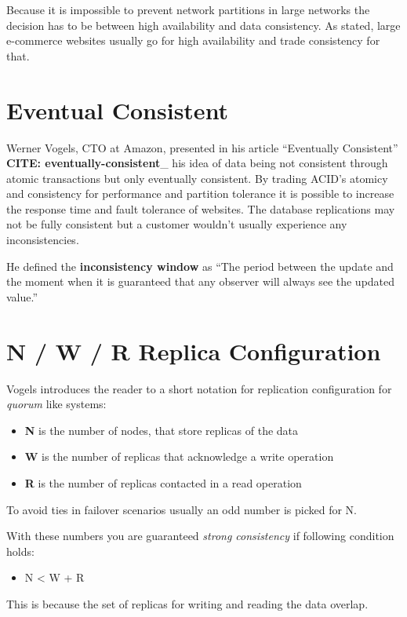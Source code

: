 Because it is impossible to prevent network partitions in large
networks the decision has to be between high availability and data
consistency. As stated, large e-commerce websites usually go for
high availability and trade consistency for that.

\section{Eventual Consistent}

Werner Vogels, CTO at Amazon, presented in his article
``Eventually Consistent'' \textbf{CITE: eventually-consistent}\_
his idea of data being not consistent through atomic transactions
but only eventually consistent. By trading ACID's atomicy and
consistency for performance and partition tolerance it is possible
to increase the response time and fault tolerance of websites. The
database replications may not be fully consistent but a customer
wouldn't usually experience any inconsistencies.

He defined the \textbf{inconsistency window} as
``The period between the update and the moment when it is guaranteed that any observer will always see the updated value.''

\section{N / W / R Replica Configuration}

Vogels introduces the reader to a short notation for replication
configuration for \emph{quorum} like systems:

\begin{itemize}
\item
  \textbf{N} is the number of nodes, that store replicas of the data
\item
  \textbf{W} is the number of replicas that acknowledge a write
  operation
\item
  \textbf{R} is the number of replicas contacted in a read operation
\end{itemize}
To avoid ties in failover scenarios usually an odd number is picked
for N.

With these numbers you are guaranteed \emph{strong consistency} if
following condition holds:

\begin{itemize}
\item
  N \textless{} W + R
\end{itemize}
This is because the set of replicas for writing and reading the
data overlap.

